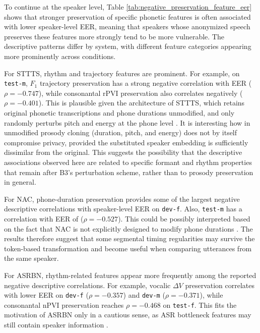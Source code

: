 \documentclass[12pt,leqno,a4paper]{article}
\begin{document}
To continue at the speaker level, Table \ref{tab:negative_preservation_feature_eer} shows that stronger preservation of specific phonetic features is often associated with lower speaker-level EER, meaning
that speakers whose anonymized speech preserves these features more strongly tend to be more vulnerable. The descriptive patterns differ by system, with different feature categories appearing more prominently across conditions.

For STTTS, rhythm and trajectory features are prominent. For example, on \texttt{test-m}, $F_1$ trajectory preservation has a strong negative correlation with EER ($\rho=-0.747$), while consonantal rPVI preservation also correlates negatively ($\rho=-0.401$).
This is plausible given the architecture of STTTS, which retains original phonetic transcriptions and phone durations unmodified, and only randomly perturbs pitch and energy at the phone level \cite{tomashenko2024voiceprivacy2024challengeevaluation}.
It is interesting how in \cite{meyer_prosody_2023} unmodified prosody cloning (duration, pitch, and energy) does not by itself compromise privacy, provided the substituted speaker embedding is sufficiently dissimilar from the original. 
This suggests the possibility that the descriptive associations observed here are related to specific formant and rhythm properties that remain after B3's perturbation scheme, rather than to prosody preservation in general.

For NAC, phone-duration preservation provides some of the largest negative descriptive correlations with speaker-level EER on \texttt{dev-f}. 
Also, \texttt{test-m} has a correlation with EER of ($\rho=-0.527$). This could be possibly interpreted based on the fact that NAC is not explicitly designed to modify phone durations \citep{panariello_speaker_2024}. 
The results therefore suggest that some segmental timing regularities may survive the token-based transformation and become useful when comparing utterances from the same speaker.

For ASRBN, rhythm-related features appear more frequently among the reported negative descriptive correlations. For example, vocalic $\Delta V$ preservation correlates with lower EER on \texttt{dev-f} ($\rho=-0.357$) and \texttt{dev-m} ($\rho=-0.371$), while consonantal nPVI preservation reaches $\rho=-0.468$ on \texttt{test-f}. 
This fits the motivation of ASRBN only in a cautious sense, as ASR bottleneck features may still contain speaker information \citep{champion_anonymizing_2024}. 
\end{document}
